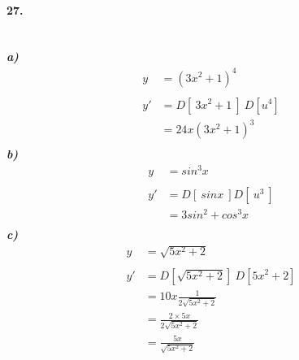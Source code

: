 \documentclass[12pt, a4paper]{article}
\begin{document}
        \paragraph*{27.}
        \textit{
            \\
            \textbf{a)}
        }
        \begin{equation*}
            \begin{split}
                y&=(3x^2 +1)^4\\\\
                y'&=D[~3x^2+1~]~D[u^4]\\
                &=24x(3x^2+1)^3\\
            \end{split}
        \end{equation*}
        \textit{
            \textbf{b)}
        }
        \begin{equation*}
            \begin{split}
                y&=sin^3x\\\\
                y'&=D[~sinx~] D[~u^3~]\\
                &= 3sin^2 + cos^3x\\
            \end{split}
        \end{equation*}
        \textit{
            \textbf{c)}
        }
        \begin{equation*}
            \begin{split}
                y&=\sqrt{5x^2+2}\\\\
                y'&=D[\sqrt{5x^2+2}]~D[5x^2+2]\\
                &=10x\frac{1}{2\sqrt{5x^2+2}}\\
                &=\frac{2\times 5x}{2\sqrt{5x^2+2}}\\
                &=\frac{5x}{\sqrt{5x^2+2}}\\
            \end{split}
        \end{equation*}
\end{document}

